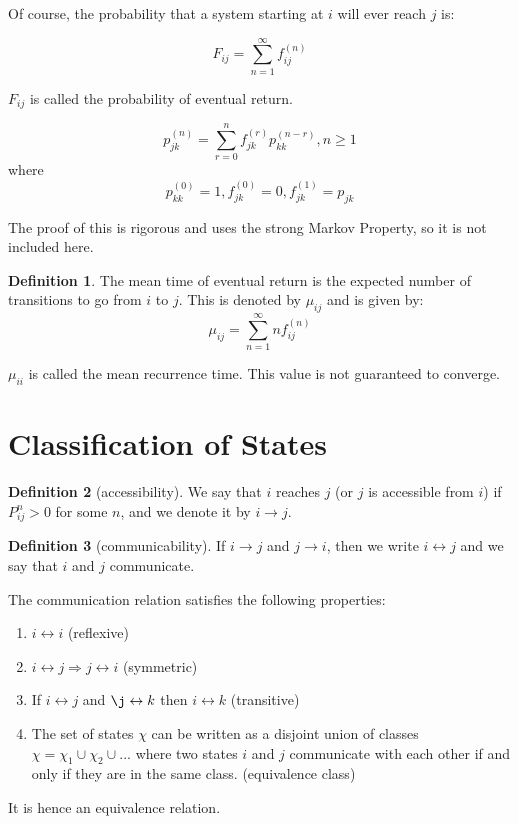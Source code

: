 \documentclass[12pt,letterpaper]{amsbook}
\theoremstyle{definition}
\newtheorem{definition}{Definition}%
\begin{document}
Of course, the probability that a system starting at $i$ will ever reach $j$ is:

\[F_{ij} = \sum_{n=1}^{\infty} f_{ij}^{(n)}\]

$F_{ij}$ is called the probability of eventual return.

\begin{theorem}
  \[p_{jk}^{(n)} = \sum_{r=0}^n f_{jk}^{(r)}p_{kk}^{(n-r)}, n \geq 1\]
  where
  \[p_{kk}^{(0)} = 1, f_{jk}^{(0)} = 0, f_{jk}^{(1)} = p_{jk}\]
\end{theorem}

The proof of this is rigorous and uses the strong Markov Property, so it is not included here.


\begin{definition}
The mean time of eventual return is the expected number of transitions to go from $i$ to $j$. This is denoted by $\mu_{ij}$ and is given by:
\[\mu_{ij} = \sum_{n=1}^{\infty} n f_{ij}^{(n)}\]
\end{definition}

$\mu_{ii}$ is called the mean recurrence time. This value is not guaranteed to converge.

\section{Classification of States}

\begin{definition}[accessibility]
  We say that $i$ reaches $j$ (or $j$ is accessible from $i$) if $P^{n}_{ij} > 0$ for some $n$, and we denote it by $i \rightarrow j$.
\end{definition}

\begin{definition}  [communicability]
  If $i \rightarrow j$ and $j \rightarrow i$, then we write $i \leftrightarrow j$ and we say that $i$ and $j$ communicate.
\end{definition}

\begin{theorem}
  The communication relation satisfies the following properties:
  \begin{enumerate}
    \item $i \leftrightarrow i$ (reflexive)
    \item $i \leftrightarrow j \Rightarrow j \leftrightarrow i$ (symmetric)
    \item If $i \leftrightarrow j$ and $\j \leftrightarrow k$ then $i \leftrightarrow k$ (transitive)
    \item The set of states $\chi$ can be written as a disjoint union of classes $\chi = \chi_1 \cup \chi_2 \cup ...$ where two states $i$ and $j$ communicate with each other if and only if they are in the same class. (equivalence class)
  \end{enumerate}
  It is hence an equivalence relation.
\end{theorem}
\end{document}
